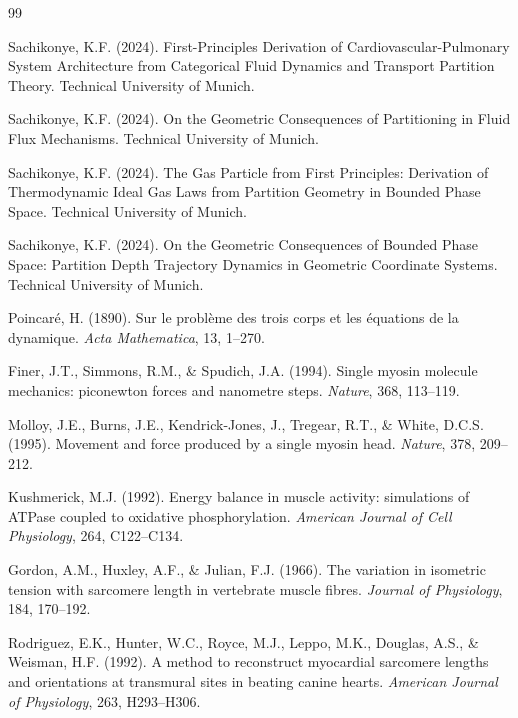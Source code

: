 \documentclass[10pt,twocolumn,a4paper]{article}
\theoremstyle{remark}
\begin{document}
\begin{thebibliography}{99}

Sachikonye, K.F. (2024). First-Principles Derivation of Cardiovascular-Pulmonary System Architecture from Categorical Fluid Dynamics and Transport Partition Theory. Technical University of Munich.

Sachikonye, K.F. (2024). On the Geometric Consequences of Partitioning in Fluid Flux Mechanisms. Technical University of Munich.

Sachikonye, K.F. (2024). The Gas Particle from First Principles: Derivation of Thermodynamic Ideal Gas Laws from Partition Geometry in Bounded Phase Space. Technical University of Munich.

Sachikonye, K.F. (2024). On the Geometric Consequences of Bounded Phase Space: Partition Depth Trajectory Dynamics in Geometric Coordinate Systems. Technical University of Munich.

Poincar\'{e}, H. (1890). Sur le probl\`eme des trois corps et les \'{e}quations de la dynamique. \textit{Acta Mathematica}, 13, 1--270.

Finer, J.T., Simmons, R.M., \& Spudich, J.A. (1994). Single myosin molecule mechanics: piconewton forces and nanometre steps. \textit{Nature}, 368, 113--119.

Molloy, J.E., Burns, J.E., Kendrick-Jones, J., Tregear, R.T., \& White, D.C.S. (1995). Movement and force produced by a single myosin head. \textit{Nature}, 378, 209--212.

Kushmerick, M.J. (1992). Energy balance in muscle activity: simulations of ATPase coupled to oxidative phosphorylation. \textit{American Journal of Cell Physiology}, 264, C122--C134.

Gordon, A.M., Huxley, A.F., \& Julian, F.J. (1966). The variation in isometric tension with sarcomere length in vertebrate muscle fibres. \textit{Journal of Physiology}, 184, 170--192.

Rodriguez, E.K., Hunter, W.C., Royce, M.J., Leppo, M.K., Douglas, A.S., \& Weisman, H.F. (1992). A method to reconstruct myocardial sarcomere lengths and orientations at transmural sites in beating canine hearts. \textit{American Journal of Physiology}, 263, H293--H306.


\end{thebibliography}
\end{document}
